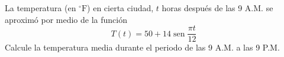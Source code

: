 \item La temperatura (en $^\circ\text{F}$) en cierta ciudad, $t$ horas después de las 9 A.M. se aproximó por medio de la función
$$T(t) = 50 + 14 \operatorname{sen} \frac{\pi t}{12}$$
Calcule la temperatura media durante el periodo de las 9 A.M. a las 9 P.M.
